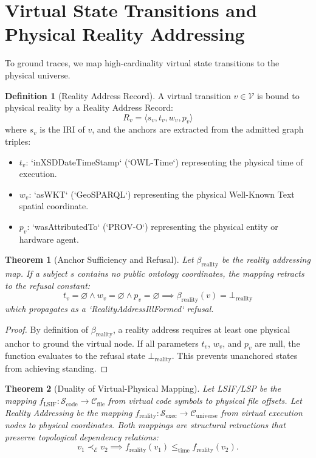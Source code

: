 \documentclass[11pt,oneside]{book}
\theoremstyle{definition}
\newtheorem{definition}{Definition}[chapter]
\theoremstyle{plain}
\newtheorem{theorem}{Theorem}[chapter]
\theoremstyle{remark}
\begin{document}
\section{Virtual State Transitions and Physical Reality Addressing}
To ground traces, we map high-cardinality virtual state transitions to the physical universe. %

\begin{definition}[Reality Address Record]\label{def:reality_address}
A virtual transition $v \in \mathcal{V}$ is bound to physical reality by a Reality Address Record:
\[
R_v = \langle s_v, t_v, w_v, p_v \rangle
\]
where $s_v$ is the IRI of $v$, and the anchors are extracted from the admitted graph triples: %
\begin{itemize}
\item $t_v$: `inXSDDateTimeStamp` (`OWL-Time`) representing the physical time of execution. %
\item $w_v$: `asWKT` (`GeoSPARQL`) representing the physical Well-Known Text spatial coordinate. %
\item $p_v$: `wasAttributedTo` (`PROV-O`) representing the physical entity or hardware agent. %
\end{itemize}
\end{definition}

\begin{theorem}[Anchor Sufficiency and Refusal]\label{thm:anchor_suff}
Let $\beta_{\mathrm{reality}}$ be the reality addressing map. %
If a subject $s$ contains no public ontology coordinates, the mapping retracts to the refusal constant:
\[
t_v = \varnothing \land w_v = \varnothing \land p_v = \varnothing \implies \beta_{\mathrm{reality}}(v) = \bot_{\mathrm{reality}}
\]
which propagates as a `RealityAddressIllFormed` refusal. %
\end{theorem}

\begin{proof}
By definition of $\beta_{\mathrm{reality}}$, a reality address requires at least one physical anchor to ground the virtual node. %
If all parameters $t_v$, $w_v$, and $p_v$ are null, the function evaluates to the refusal state $\bot_{\mathrm{reality}}$. %
This prevents unanchored states from achieving standing. %
\end{proof}

\begin{theorem}[Duality of Virtual-Physical Mapping]\label{thm:duality_map}
Let LSIF/LSP be the mapping $f_{\mathrm{LSIF}} : \mathcal{S}_{\mathrm{code}} \to \mathcal{C}_{\mathrm{file}}$ from virtual code symbols to physical file offsets. %
Let Reality Addressing be the mapping $f_{\mathrm{reality}} : \mathcal{S}_{\mathrm{exec}} \to \mathcal{C}_{\mathrm{universe}}$ from virtual execution nodes to physical coordinates. %
Both mappings are structural retractions that preserve topological dependency relations:
\[
v_1 \prec_{\mathcal{E}} v_2 \implies f_{\mathrm{reality}}(v_1) \le_{\mathrm{time}} f_{\mathrm{reality}}(v_2).
\]
\end{theorem}
\end{document}
